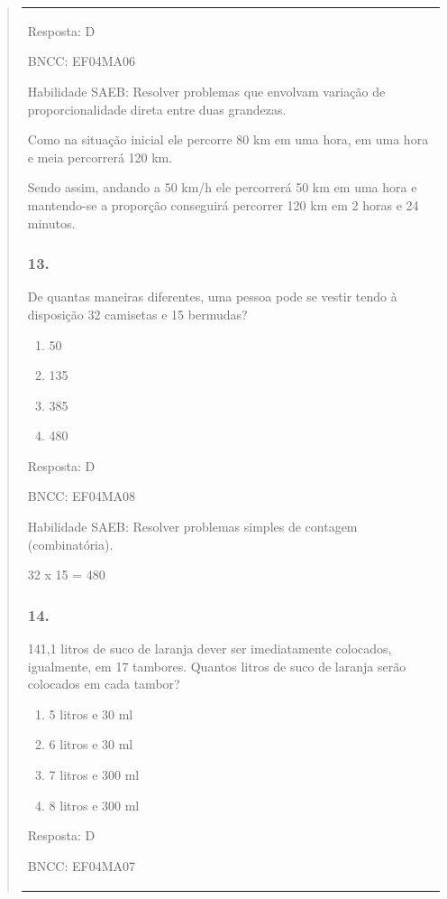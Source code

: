\begin{enumerate}
\begin{escolha}
\begin{enumerate}
\begin{itemize}
\begin{itemize}
\begin{escolha}
\begin{quote}
\begin{escolha}
{\begin{longtable}[]{@{}l@{}}
\begin{itemize}
Resposta: D

BNCC: EF04MA06

Habilidade SAEB: Resolver problemas que envolvam variação de
proporcionalidade direta entre duas grandezas.

Como na situação inicial ele percorre 80 km em uma hora, em uma hora e
meia percorrerá 120 km.

Sendo assim, andando a 50 km/h ele percorrerá 50 km em uma hora e
mantendo-se a proporção conseguirá percorrer 120 km em 2 horas e 24
minutos.

\subsubsection{13. }\label{section-154}

De quantas maneiras diferentes, uma pessoa pode se vestir tendo à
disposição 32 camisetas e 15 bermudas?

\begin{enumerate}
\def\labelenumi{\alph{enumi})}
\item
  50
\item
  135
\item
  385
\item
  480
\end{enumerate}

Resposta: D

BNCC: EF04MA08

Habilidade SAEB: Resolver problemas simples de contagem (combinatória).

32 x 15 = 480

\subsubsection{14.}\label{section-155}

141,1 litros de suco de laranja dever ser imediatamente colocados,
igualmente, em 17 tambores. Quantos litros de suco de laranja serão
colocados em cada tambor?

\begin{enumerate}
\def\labelenumi{\alph{enumi})}
\item
  5 litros e 30 ml
\item
  6 litros e 30 ml
\item
  7 litros e 300 ml
\item
  8 litros e 300 ml
\end{enumerate}

Resposta: D

BNCC: EF04MA07


\end{itemize}
\end{longtable}}
\end{escolha}
\end{quote}
\end{escolha}
\end{itemize}
\end{itemize}
\end{enumerate}
\end{escolha}
\end{enumerate}
